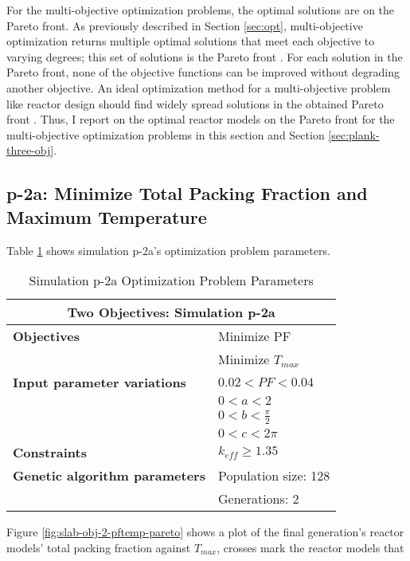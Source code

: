 For the multi-objective optimization problems, the optimal solutions are on the 
Pareto front. 
As previously described in Section \ref{sec:opt}, multi-objective optimization returns 
multiple optimal solutions that meet each objective to varying degrees; this set of 
solutions is the Pareto front \cite{deb_multi-objective_2001}. 
For each solution in the Pareto front, none of the objective functions can be 
improved without degrading another objective.
An ideal optimization method for a multi-objective problem like reactor design 
should find widely spread solutions in the obtained Pareto front 
\cite{deb_multi-objective_2001}. 
Thus, I report on the optimal reactor models on the Pareto front for the multi-objective 
optimization problems in this section and Section \ref{sec:plank-three-obj}. 

\subsection{p-2a: Minimize Total Packing Fraction and Maximum Temperature}
\label{sec:p-2a}
Table \ref{tab:simulationp2a} shows simulation p-2a's optimization problem parameters. 
\begin{table}[htbp!]
    \centering
    \onehalfspacing
    \caption{Simulation p-2a Optimization Problem Parameters}
	\label{tab:simulationp2a}
    \footnotesize
    \begin{tabular}{l|p{4cm}}
    \hline 
    \multicolumn{2}{c}{\textbf{Two Objectives: Simulation p-2a}} \\
    \hline 
    \textbf{Objectives} & Minimize PF \\
    & Minimize $T_{max}$ \\
    \hline 
    \textbf{Input parameter variations} & $0.02<PF<0.04$ \\
    & $0<a<2$ \\
    & $0<b<\frac{\pi}{2}$ \\
    & $0<c<2\pi$ \\
    \hline
    \textbf{Constraints} & $k_{eff} \geq 1.35$\\ 
    \hline 
    \textbf{Genetic algorithm parameters} & Population size: 128 \\
    & Generations: 2 \\
    \hline
    \end{tabular}
\end{table}
Figure \ref{fig:slab-obj-2-pftemp-pareto} shows a plot of the final generation's reactor 
models' total packing fraction against $T_{max}$, crosses mark the reactor models that 
